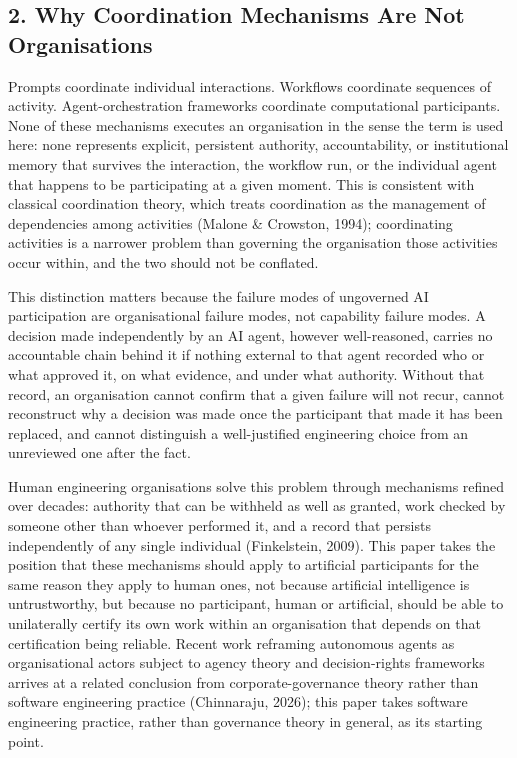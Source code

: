 \documentclass[
  11pt,
]{article}
\begin{document}
\hypertarget{why-coordination-mechanisms-are-not-organisations}{%
\subsection{2. Why Coordination Mechanisms Are Not
Organisations}\label{why-coordination-mechanisms-are-not-organisations}}

Prompts coordinate individual interactions. Workflows coordinate
sequences of activity. Agent-orchestration frameworks coordinate
computational participants. None of these mechanisms executes an
organisation in the sense the term is used here: none represents
explicit, persistent authority, accountability, or institutional memory
that survives the interaction, the workflow run, or the individual agent
that happens to be participating at a given moment. This is consistent
with classical coordination theory, which treats coordination as the
management of dependencies among activities (Malone \& Crowston, 1994);
coordinating activities is a narrower problem than governing the
organisation those activities occur within, and the two should not be
conflated.

This distinction matters because the failure modes of ungoverned AI
participation are organisational failure modes, not capability failure
modes. A decision made independently by an AI agent, however
well-reasoned, carries no accountable chain behind it if nothing
external to that agent recorded who or what approved it, on what
evidence, and under what authority. Without that record, an organisation
cannot confirm that a given failure will not recur, cannot reconstruct
why a decision was made once the participant that made it has been
replaced, and cannot distinguish a well-justified engineering choice
from an unreviewed one after the fact.

Human engineering organisations solve this problem through mechanisms
refined over decades: authority that can be withheld as well as granted,
work checked by someone other than whoever performed it, and a record
that persists independently of any single individual (Finkelstein,
2009). This paper takes the position that these mechanisms should apply
to artificial participants for the same reason they apply to human ones,
not because artificial intelligence is untrustworthy, but because no
participant, human or artificial, should be able to unilaterally certify
its own work within an organisation that depends on that certification
being reliable. Recent work reframing autonomous agents as
organisational actors subject to agency theory and decision-rights
frameworks arrives at a related conclusion from corporate-governance
theory rather than software engineering practice (Chinnaraju, 2026);
this paper takes software engineering practice, rather than governance
theory in general, as its starting point.
\end{document}
